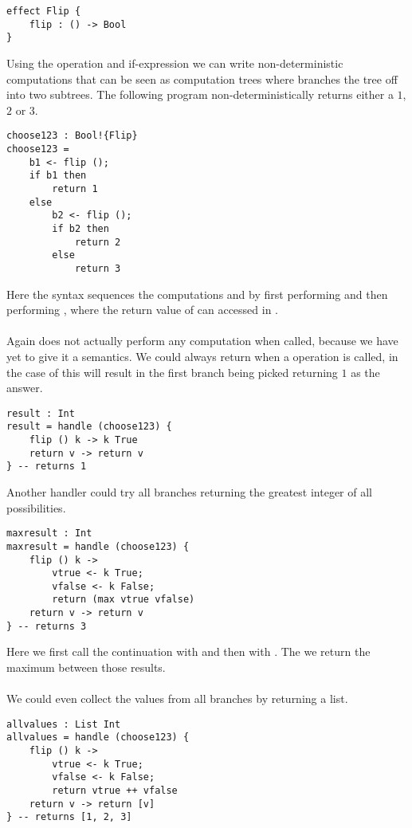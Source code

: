 \begin{verbatim}
effect Flip {
	flip : () -> Bool
}
\end{verbatim}

Using the  operation and if-expression we can write non-deterministic computations that can be seen as computation trees where  branches the tree off into two subtrees.
The following program  non-deterministically returns either a $1$, $2$ or $3$.

\begin{verbatim}
choose123 : Bool!{Flip}
choose123 =
	b1 <- flip ();
	if b1 then
		return 1
	else
		b2 <- flip ();
		if b2 then
			return 2
		else
			return 3
\end{verbatim}

Here the syntax  sequences the computations  and  by first performing  and then performing , where the return value of  can accessed in .
\\\\
Again  does not actually perform any computation when called, because we have yet to give it a semantics.
We could always return  when a  operation is called, in the case of  this will result in the first branch being picked returning $1$ as the answer.

\begin{verbatim}
result : Int
result = handle (choose123) {
	flip () k -> k True
	return v -> return v
} -- returns 1
\end{verbatim}

Another handler could try all branches returning the greatest integer of all possibilities.

\begin{verbatim}
maxresult : Int
maxresult = handle (choose123) {
	flip () k ->
		vtrue <- k True;
		vfalse <- k False;
		return (max vtrue vfalse)
	return v -> return v
} -- returns 3
\end{verbatim}

Here we first call the continuation  with  and then with .
The we return the maximum between those results.
\\\\
We could even collect the values from all branches by returning a list.

\begin{verbatim}
allvalues : List Int
allvalues = handle (choose123) {
	flip () k ->
		vtrue <- k True;
		vfalse <- k False;
		return vtrue ++ vfalse
	return v -> return [v]
} -- returns [1, 2, 3]
\end{verbatim}


